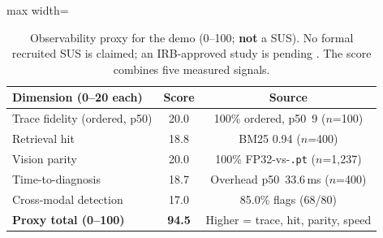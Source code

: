 \begin{table}[t]
\centering
\caption{Observability proxy for the demo (0--100; \textbf{not} a SUS). No formal recruited SUS is claimed; an IRB-approved study is pending \citep{sus1996}. The score combines five measured signals.}
\label{tab:usability_metrics}
\footnotesize
\setlength{\tabcolsep}{4pt}
\renewcommand{\arraystretch}{1.1}
\begin{adjustbox}{max width=\columnwidth}
\begin{tabular}{p{4.0cm}cc}
\toprule
\textbf{Dimension (0--20 each)} & \textbf{Score} & \textbf{Source} \\
\midrule
Trace fidelity (ordered, p50) & 20.0 & 100\% ordered, p50~9 ($n$=100) \\
Retrieval hit & 18.8 & BM25 0.94 ($n$=400) \\
Vision parity & 20.0 & 100\% FP32-vs-{\tt .pt} ($n$=1,237) \\
Time-to-diagnosis & 18.7 & Overhead p50~33.6\,ms ($n$=400) \\
Cross-modal detection & 17.0 & 85.0\% flags (68/80) \\
\midrule
\textbf{Proxy total (0--100)} & \textbf{94.5} & Higher = trace, hit, parity, speed \\
\bottomrule
\end{tabular}
\end{adjustbox}
\end{table}
